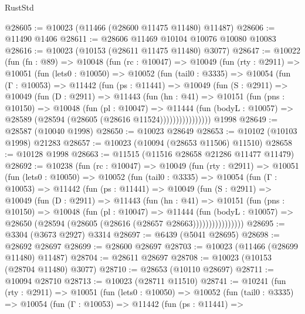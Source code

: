 \begin{lexlean}{RustStd}
\begin{coremodule}
@28605 := @10023 (@11466 (@28600 @11475 @11480) @11487)
@28606 := @11490 @1406
@28611 := @28606 @11469 @10104 @10076 @10080 @10083
@28616 := @10023 (@10153 (@28611 @11475 @11480) @3077)
@28647 := @10022
    (fun (fn : @89) =>
    @10048
      (fun (rc : @10047) =>
      @10049
        (fun (rty : @2911) =>
        @10051
          (fun (lets0 : @10050) =>
          @10052
            (fun (tail0 : @3335) =>
            @10054
              (fun (Γ : @10053) =>
              @11442
                (fun (ps : @11441) =>
                @10049
                  (fun (S : @2911) =>
                  @10049
                    (fun (D : @2911) =>
                    @11443
                      (fun (hn : @41) =>
                      @10151
                        (fun (pns : @10150) =>
                        @10048
                          (fun (pl : @10047) =>
                          @11444
                            (fun (bodyL : @10057) =>
                            @28589 (@28594 (@28605 (@28616 @11524))))))))))))))))
    @1998
@28649 := @28587 (@10040 @1998)
@28650 := @10023 @28649
@28653 := @10102 (@10103 @1998) @21283
@28657 := @10023 (@10094 (@28653 @11506) @11510)
@28658 := @10128 @1998
@28663 := @11515 (@11516 @28658 @21286 @11477 @11479)
@28692 := @10238
    (fun (rc : @10047) =>
    @10049
      (fun (rty : @2911) =>
      @10051
        (fun (lets0 : @10050) =>
        @10052
          (fun (tail0 : @3335) =>
          @10054
            (fun (Γ : @10053) =>
            @11442
              (fun (ps : @11441) =>
              @10049
                (fun (S : @2911) =>
                @10049
                  (fun (D : @2911) =>
                  @11443
                    (fun (hn : @41) =>
                    @10151
                      (fun (pns : @10150) =>
                      @10048
                        (fun (pl : @10047) =>
                        @11444
                          (fun (bodyL : @10057) =>
                          @28650 (@28594 (@28605 (@28616 (@28657 @28663))))))))))))))))
@28695 := @3304 (@3673 @2927) @3314
@28697 := @6439 (@5041 @28695)
@28698 := @28692 @28697
@28699 := @28600 @28697
@28703 := @10023 (@11466 (@28699 @11480) @11487)
@28704 := @28611 @28697
@28708 := @10023 (@10153 (@28704 @11480) @3077)
@28710 := @28653 (@10110 @28697)
@28711 := @10094 @28710
@28713 := @10023 (@28711 @11510)
@28741 := @10241
    (fun (rty : @2911) =>
    @10051
      (fun (lets0 : @10050) =>
      @10052
        (fun (tail0 : @3335) =>
        @10054
          (fun (Γ : @10053) =>
          @11442
            (fun (ps : @11441) =>

\end{coremodule}
\end{lexlean}
